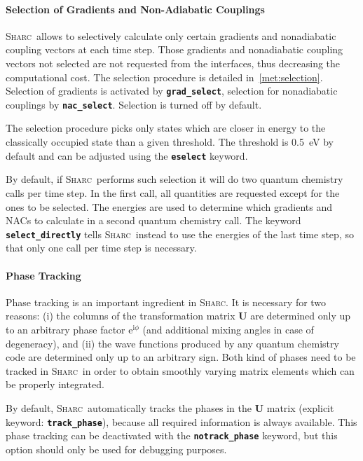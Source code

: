 \documentclass[a4paper,10pt,DIV=15,openany]{scrbook}
\newcommand{\sharc}{\textsc{Sharc}}
\newcommand{\ttt}[1]{\textbf{\texttt{#1}}}
\newcommand{\VEC}[1]{\ensuremath{\mathbf{#1}}}
\begin{document}
\paragraph{Selection of Gradients and Non-Adiabatic Couplings}

\sharc\ allows to selectively calculate only certain gradients and nonadiabatic coupling vectors at each time step. Those gradients and nonadiabatic coupling vectors not selected are not requested from the interfaces, thus decreasing the computational cost. The selection procedure is detailed in~\ref{met:selection}.
Selection of gradients is activated by \ttt{grad\_select}, selection for nonadiabatic couplings by \ttt{nac\_select}. Selection is turned off by default. 

The selection procedure picks only states which are closer in energy to the classically occupied state than a given threshold. The threshold is 0.5~eV by default and can be adjusted using the \ttt{eselect} keyword.

By default, if \sharc\ performs such selection it will do two quantum chemistry calls per time step. In the first call, all quantities are requested except for the ones to be selected. The energies are used to determine which gradients and NACs to calculate in a second quantum chemistry call. The keyword \ttt{select\_directly} tells \sharc\ instead to use the energies of the last time step, so that only one call per time step is necessary.

\paragraph{Phase Tracking}

Phase tracking is an important ingredient in \sharc. It is necessary for two reasons: (i) the columns of the transformation matrix $\VEC{U}$ are determined only up to an arbitrary phase factor $\mathrm{e}^{\mathrm{i}\phi}$ (and additional mixing angles in case of degeneracy), and (ii) the wave functions produced by any quantum chemistry code are determined only up to an arbitrary sign.
Both kind of phases need to be tracked in \sharc\ in order to obtain smoothly varying matrix elements which can be properly integrated.

By default, \sharc\ automatically tracks the phases in the $\VEC{U}$ matrix (explicit keyword: \ttt{track\_phase}), because all required information is always available. This phase tracking can be deactivated with the \ttt{notrack\_phase} keyword, but this option should only be used for debugging purposes.
\end{document}

